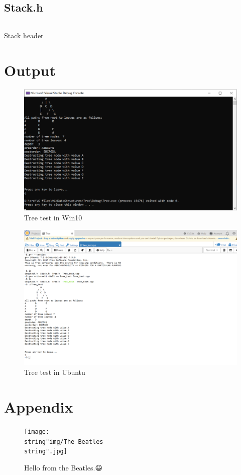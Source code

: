 \documentclass{article}
\begin{document}
	\subsection{Stack.h}	
	\begin{longlisting}
		\inputminted{c++}{src/Stack.h}
		\caption{Stack header}
		\label{Stack.h}
	\end{longlisting}
	
	\clearpage
	\pagecolor{picturebg}
	\afterpage{\nopagecolor}
	\section{Output}
	\begin{figure}[!hb]
		\centering
		\includegraphics[width=0.95\linewidth]{img/tree_test_win10}
		\caption{Tree test in Win10}
		\label{fig:tree_test_win10}
	\end{figure}

	\begin{figure}[!hb]
	\centering
	\includegraphics[width=0.95\linewidth]{img/tree_test_ubuntu}
	\caption{Tree test in Ubuntu}
	\label{fig:tree_test_ubuntu}
	\end{figure}
	
	\clearpage
	\section{Appendix}
	\begin{figure}[!hb]
		\centering
		\texttt{[image: \\string"img/The 
			Beatles\\string".jpg]}
		\caption*{Hello from the Beatles.😃}
		\label{fig:the-beatles}
	\end{figure}
	
\end{document}
